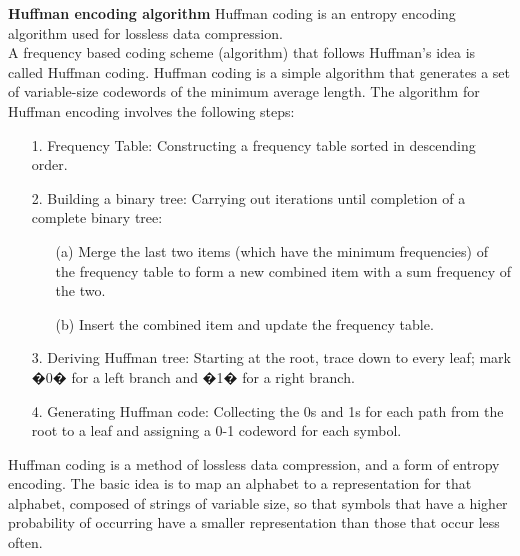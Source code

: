 
{
\noindent \textbf{Huffman encoding algorithm}
Huffman coding is an entropy encoding algorithm used for lossless data compression.\\
\bigskip
A frequency based coding scheme (algorithm) that follows Huffman's idea is called Huffman coding. Huffman coding is a simple algorithm that generates a set of variable-size codewords of the minimum average length. The algorithm for Huffman encoding involves the following steps:
}

{
\begin{itemize}
\item[1.] Frequency Table: Constructing a frequency table sorted in descending order.

\item[2.] Building a binary tree:
    Carrying out iterations until completion of a complete binary tree:
    \begin{itemize}
    \item[(a)] Merge the last two items (which have the minimum frequencies) of    the frequency table to form a new combined item with a sum
    frequency of the two.
    \item[(b)] Insert the combined item and update the frequency table.
    \end{itemize}

\item[3.] Deriving Huffman tree:
Starting at the root, trace down to every leaf; mark �0� for a left branch and �1� for a right branch.

\item[4.] Generating Huffman code:
Collecting the 0s and 1s for each path from the root to a leaf and assigning a 0-1 codeword for each symbol.

\end{itemize}
}

{

Huffman coding is a method of lossless data compression, and a form of entropy encoding. The basic idea is to map an alphabet to a representation for that alphabet, composed of strings of variable size, so that symbols that have a higher probability of occurring have a smaller representation than those that occur less often.

}

